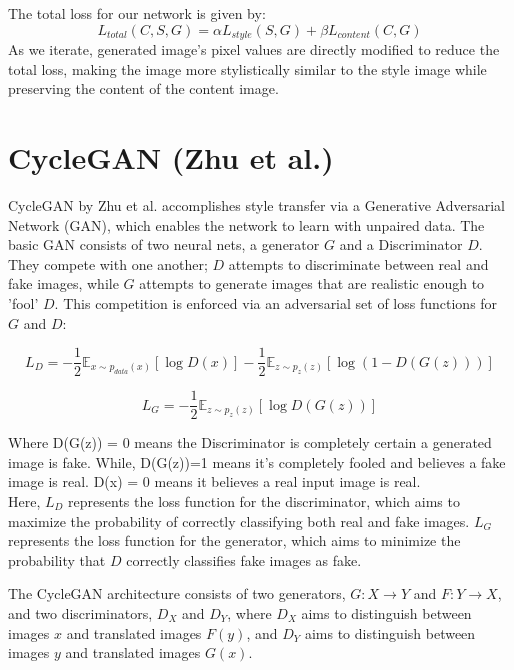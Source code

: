 \documentclass[12pt]{article}
\begin{document}
The total loss for our network is given by:
\begin{equation}
L_{total}(C,S,G) = \alpha L_{style}(S, G) + \beta L_{content}(C, G)
\end{equation}
As we iterate, generated image's pixel values are directly modified to reduce the total loss, making the image more stylistically similar to the style image while preserving the content of the content image. 

\section{CycleGAN (Zhu et al.)}

CycleGAN by Zhu et al. accomplishes style transfer via a Generative Adversarial Network (GAN), which enables the network to learn with unpaired data. The basic GAN consists of two neural nets, a generator \(G\) and a Discriminator \(D\). They compete with one another; \(D\) attempts to discriminate between real and fake images, while \(G\) attempts to generate images that are realistic enough to 'fool' \(D\). This competition is enforced via an adversarial set of loss functions for \(G\) and \(D\):

\begin{equation}
L_D = -\frac{1}{2}\mathbb{E}_{x\sim p_{data}(x)}[\log D(x)] - \frac{1}{2}\mathbb{E}_{z\sim p_z(z)}[\log(1 - D(G(z)))]
\end{equation}

\begin{equation}
L_G = -\frac{1}{2}\mathbb{E}_{z\sim p_z(z)}[\log D(G(z))]
\end{equation}

Where D(G(z)) = 0 means the Discriminator is completely certain a generated image is fake. While, D(G(z))=1 means it's completely fooled and believes a fake image is real. D(x) = 0 means it believes a real input image is real. \\

Here, \(L_D\) represents the loss function for the discriminator, which aims to maximize the probability of correctly classifying both real and fake images. \(L_G\) represents the loss function for the generator, which aims to minimize the probability that \(D\) correctly classifies fake images as fake.

The CycleGAN architecture consists of two generators, \(G: X \rightarrow Y\) and \(F: Y \rightarrow X\), and two discriminators, \(D_X\) and \(D_Y\), where \(D_X\) aims to distinguish between images \(x\) and translated images \(F(y)\), and \(D_Y\) aims to distinguish between images \(y\) and translated images \(G(x)\). 
\end{document}
